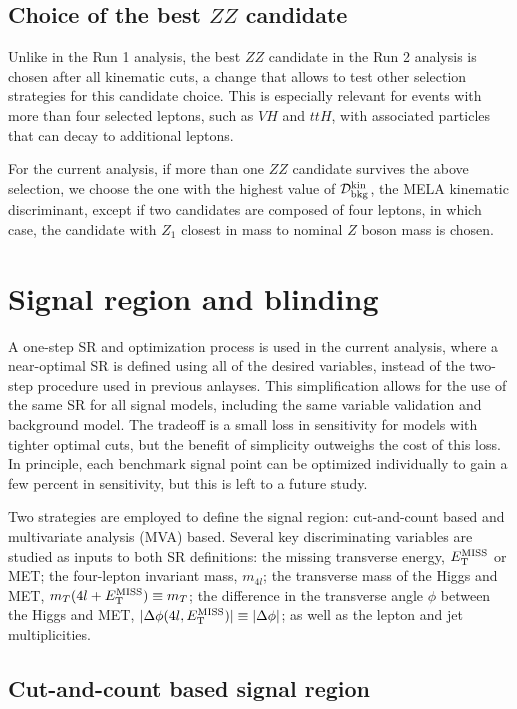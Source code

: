 \subsection{Choice of the best $ZZ$ candidate}
\label{sec:zzbestcand}

Unlike in the Run 1 analysis, the best $ZZ$ candidate in the Run 2 analysis is chosen after all kinematic cuts, a change that allows to test other selection strategies for this candidate choice. 
This is especially relevant for events with more than four selected leptons, such as $VH$ and $ttH$, with associated particles that can decay to additional leptons.

For the current analysis, if more than one $ZZ$ candidate survives the above selection,
we choose the one with the highest value of $\KD$, the MELA kinematic discriminant, except if
two candidates are composed of four leptons, in which case, the candidate with $Z_1$ closest in mass to nominal 
$Z$ boson mass is chosen.


\section{Signal region and blinding}

A one-step SR and optimization process is used in the current analysis, where a near-optimal SR is defined using all of the desired variables, instead of the two-step procedure used in previous anlayses. This simplification allows for the use of the same SR for all signal models, including the same variable validation and background model. The tradeoff is a small loss in sensitivity for models with tighter optimal cuts, but the benefit of simplicity outweighs the cost of this loss. In principle, each benchmark signal point can be optimized individually to gain a few percent in sensitivity, but this is left to a future study.

Two strategies are employed to define the signal region: cut-and-count based and multivariate analysis (MVA) based. Several key discriminating variables are studied as inputs to both SR definitions: the missing transverse energy, $E_{\rm{T}}^{\rm{MISS}}$ or MET; the four-lepton invariant mass, $m_{4l}$; the transverse mass of the Higgs and MET, $m_T(4l+E_{\rm{T}}^{\rm{MISS}}) \equiv m_T$; the difference in the transverse angle $\phi$ between the Higgs and MET, $|\Delta\phi(4l, E_{\rm{T}}^{\rm{MISS}})| \equiv |\Delta\phi|$; as well as the lepton and jet multiplicities.

\subsection{Cut-and-count based signal region} \label{cutandcountopt}

